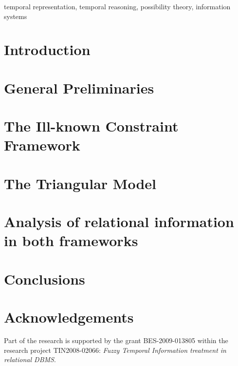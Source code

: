 \documentclass[twocolumn,a4paper]{article}
\theoremstyle{definition}
\begin{document}
\begin{keywords}
temporal representation, temporal reasoning, possibility theory, information systems
\end{keywords}

\section{\label{sec:introduction}Introduction}


\section{\label{sec:general-preliminaries}General Preliminaries}


\section{\label{sec:ikc}The Ill-known Constraint Framework}


\section{\label{sec:tm}The Triangular Model}


\section{\label{sec:proposal}Analysis of relational information in both frameworks}


\section{\label{sec:conclusions}Conclusions}


\section*{Acknowledgements}
Part of the research is supported by the grant BES-2009-013805 within the research project TIN2008-02066: \emph{Fuzzy Temporal Information treatment in relational DBMS}.
\end{document}
